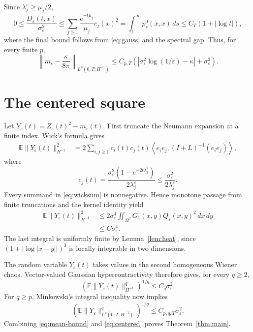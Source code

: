 \documentclass[11pt]{article}
\newcommand{\E}{\mathbb E}
\newcommand{\Om}{\Omega}
\begin{document}
Since $\lambda_j^\varepsilon\geq\mu_j/2$,
\[
 0\leq \frac{D_\varepsilon(t,x)}{\sigma_\varepsilon^2}
 \leq\sum_{j\geq1}\frac{e^{-t\mu_j}}{\mu_j}e_j(x)^2
 =\int_t^\infty p_s^0(x,x)\,ds
 \leq C_T(1+|\log t|),
\]
where the final bound follows from \eqref{eq:gauss} and the spectral gap.
Thus, for every finite $p$,
\begin{equation}\label{eq:mean-bound}
 \left\|m_\varepsilon-\frac\kappa{8\pi}\right\|_{L^p(0,T;H^{-1})}
 \leq C_{p,T}\left(
 |\sigma_\varepsilon^2\log(1/\varepsilon)-\kappa|
 +\sigma_\varepsilon^2\right).
\end{equation}

\section{The centered square}

Let $Y_\varepsilon(t)=Z_\varepsilon(t)^2-m_\varepsilon(t)$.  First truncate
the Neumann expansion at a finite index.  Wick's formula gives
\begin{align}
 \E\|Y_\varepsilon(t)\|_{H^{-1}}^2
 &=2\sum_{i,j\geq1}c_i(t)c_j(t)
 \left\langle e_ie_j,(I+L)^{-1}(e_ie_j)\right\rangle,
 \label{eq:wicksum}
\end{align}
where
\[
 c_j(t)=\frac{\sigma_\varepsilon^2
 (1-e^{-2t\lambda_j^\varepsilon})}{2\lambda_j^\varepsilon}
 \leq\frac{\sigma_\varepsilon^2}{2\lambda_j^\varepsilon}.
\]
Every summand in \eqref{eq:wicksum} is nonnegative.  Hence monotone passage
from finite truncations and the kernel identity yield
\begin{align*}
 \E\|Y_\varepsilon(t)\|_{H^{-1}}^2
 &\leq2\sigma_\varepsilon^4
 \iint_{\Om^2}G_1(x,y)Q_\varepsilon(x,y)^2\,dx\,dy\\
 &\leq C\sigma_\varepsilon^4.
\end{align*}
The last integral is uniformly finite by Lemma~\ref{lem:heat}, since
$(1+|\log|x-y||)^3$ is locally integrable in two dimensions.

The random variable $Y_\varepsilon(t)$ takes values in the second homogeneous
Wiener chaos.  Vector-valued Gaussian hypercontractivity therefore gives,
for every $q\geq2$,
\[
 \left(\E\|Y_\varepsilon(t)\|_{H^{-1}}^q\right)^{1/q}
 \leq C_q\sigma_\varepsilon^2.
\]
For $q\geq p$, Minkowski's integral inequality now implies
\begin{equation}\label{eq:centered}
 \left(\E\|Y_\varepsilon\|_{L^p(0,T;H^{-1})}^q\right)^{1/q}
 \leq C_{p,q,T}\sigma_\varepsilon^2.
\end{equation}
Combining \eqref{eq:mean-bound} and \eqref{eq:centered} proves
Theorem~\ref{thm:main}.
\end{document}
